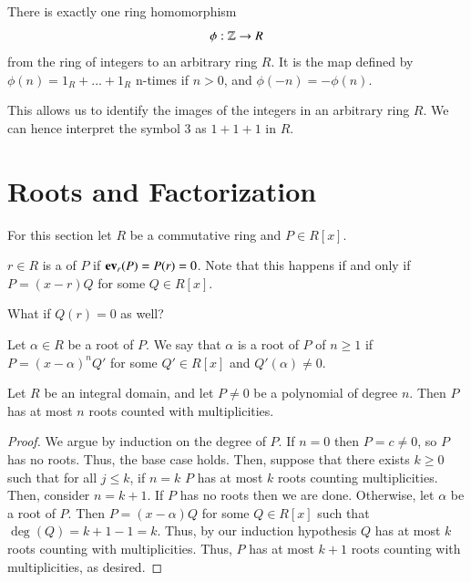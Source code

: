 \documentclass[12pt, a4paper, oneside, openright, titlepage]{book}
\begin{document}
\begin{prop}
        There is exactly one ring homomorphism \begin{equation}
                \phi:\mathbb Z\rightarrow R
        \end{equation}
        from the ring of integers to an arbitrary ring $R$. It is the map defined by $\phi(n) = 1_R+...+1_R$ n-times if $n > 0$, and $\phi(-n) = -\phi(n)$.
\end{prop}


\begin{rmk}
        This allows us to identify the images of the integers in an arbitrary ring $R$. We can hence interpret the symbol $3$ as $1+1+1$ in $R$.
\end{rmk}


\section{\textsection Roots and Factorization}

For this section let $R$ be a commutative ring and $P \in R[x]$.

\begin{defn}
    $r \in R$ is a  of $P$ if $\operatorname{\bf{ev}}_r(P) = P(r) = 0$. Note that this happens if and only if $P = (x-r)Q$ for some $Q \in R[x]$.
\end{defn}

\begin{qest}
    What if $Q(r) = 0$ as well?
\end{qest}

\begin{defn}
    Let $\alpha \in R$ be a root of $P$. We say that $\alpha$ is a root of $P$ of  $n \geq 1$ if $P = (x-\alpha)^nQ'$ for some $Q' \in R[x]$ and $Q'(\alpha) \neq 0$.
\end{defn}

\begin{prop}
    Let $R$ be an integral domain, and let $P \neq 0$ be a polynomial of degree $n$. Then $P$ has at most $n$ roots counted with multiplicities.
\end{prop}
\begin{proof}
    We argue by induction on the degree of $P$. If $n = 0$ then $P = c \neq 0$, so $P$ has no roots. Thus, the base case holds. Then, suppose that there exists $k \geq 0$ such that for all $j \leq k$, if $n = k$ $P$ has at most $k$ roots counting multiplicities. Then, consider $n = k+1$. If $P$ has no roots then we are done. Otherwise, let $\alpha$ be a root of $P$. Then $P = (x-\alpha)Q$ for some $Q \in R[x]$ such that $\deg(Q) = k+1-1 = k$. Thus, by our induction hypothesis $Q$ has at most $k$ roots counting with multiplicities. Thus, $P$ has at most $k + 1$ roots counting with multiplicities, as desired.
\end{proof}
\end{document}
